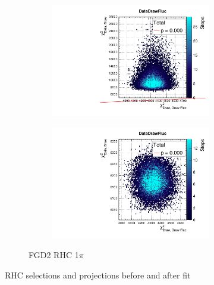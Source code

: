 \begin{figure}[h]
\begin{subfigure}[t]{\textwidth}
\begin{subfigure}[t]{0.24\textwidth}
			\includegraphics[width=\textwidth, trim={0mm 0mm 0mm 8mm}, clip,page=155]{figures/mach3/2018/data/2018a_FixedCov_RedCov_Mpi_Data_merge_PriorPred_procs}
		\end{subfigure}
		\begin{subfigure}[t]{0.24\textwidth}
			\includegraphics[width=\textwidth, trim={0mm 0mm 0mm 8mm}, clip,page=155]{figures/mach3/2018/data/2018a_FixedCov_RedCov_Mpi_Data_merge_PostPredStore_FullLLH_procs}
		\end{subfigure}
		\caption{FGD2 \numu RHC 1$\pi$}
	\end{subfigure}
	\caption{RHC \numu selections \pmu and \cosmu projections before and after fit}
	\label{fig:fhc_postfit_0pi_1pi_numuRHC_2018}
\end{figure}

